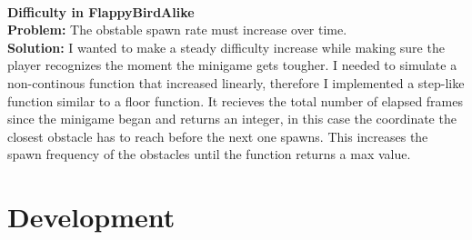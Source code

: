 \documentclass[a4paper,12pt]{report}
\begin{document}
\pagebreak\\
\textbf{Difficulty in FlappyBirdAlike}\\
\textbf{Problem:} The obstable spawn rate must increase over time.\\
\textbf{Solution:} I wanted to make a steady difficulty increase while making sure the player recognizes the moment the minigame gets tougher.
I needed to simulate a non-continous function that increased linearly, therefore I implemented a step-like function similar to a floor function.
It recieves the total number of elapsed frames since the minigame began and returns an integer, in this case the coordinate the closest obstacle
has to reach before the next one spawns. This increases the spawn frequency of the obstacles until the function returns a max value.

\chapter{Development}
\end{document}
